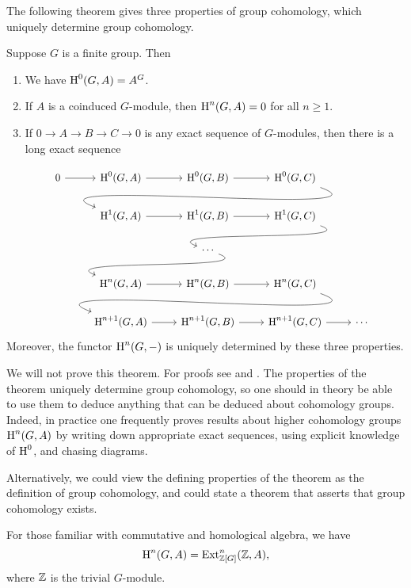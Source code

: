 The following theorem gives three properties of group cohomology,
which uniquely determine group cohomology.
\begin{theorem}\label{thm:cohomology}
	Suppose $G$ is a finite group.  Then
	\begin{enumerate}
		\item
			We have $\operatorname{H}^0(G,A) = A^G$.
		\item
			If $A$ is a coinduced $G$-module,
			then $\operatorname{H}^n(G,A) = 0$ for all $n\geq 1$.
		\item
			If $0\to A \to B \to C \to 0$ is any exact sequence of
			$G$-modules, then there is a long exact sequence
	\end{enumerate}
	$$
	\begin{tikzcd}
0 \rar & \H^0(G,A) \rar & \H^0(G,B) \rar & \H^0(G,C) \ar[out=-20, in=160]{dll}
\\
& \H^1(G,A) \rar & \H^1(G,B) \rar & \H^1(G,C) \ar[out=-20, in=160]{dl}
\\
& & \cdots \ar[out=-20, in=160]{dl}
\\
& \H^n(G,A) \rar & \H^n(G,B) \rar & \H^n(G,C) \ar[out=-20, in=160]{dll}
\\
& \H^{n+1}(G,A) \rar & \H^{n+1}(G,B) \rar & \H^{n+1}(G,C) \rar & \cdots
	\end{tikzcd}
	$$
	Moreover, the functor $\operatorname{H}^n(G,-)$ is uniquely determined by
	these three properties.
\end{theorem}

We will not prove this theorem.  For proofs see
\cite[Atiyah-Wall]{cassels-frohlich} and
\cite[Ch.~7]{serre:localfields}. The properties of the theorem
uniquely determine group cohomology, so one should in theory be able
to use them to deduce anything that can be deduced about cohomology
groups.  Indeed, in practice one frequently proves results about
higher cohomology groups $\operatorname{H}^n(G,A)$ by writing down appropriate exact
sequences, using explicit knowledge of $\operatorname{H}^0$, and chasing diagrams.

\begin{remark}
	Alternatively, we could view the defining properties of the theorem
	as the definition of group cohomology, and could state a theorem
	that asserts that group cohomology exists.
\end{remark}

\begin{remark}
	For those familiar with commutative and homological algebra, we have
	$$
		\operatorname{H}^n(G,A) = \operatorname{Ext}^n_{\mathbb{Z}[G]}(\mathbb{Z}, A),
	$$
	where $\mathbb{Z}$ is the trivial $G$-module.
\end{remark}

